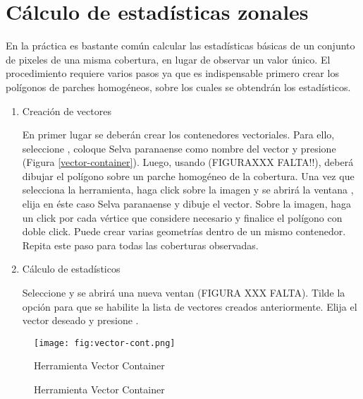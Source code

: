 \section{Cálculo de estadísticas zonales}

En la práctica es bastante común calcular las estadísticas básicas de un conjunto de pixeles de una misma cobertura, en lugar de observar un valor único. El procedimiento requiere varios pasos ya que es indispensable primero crear los polígonos de parches homogéneos, sobre los cuales se obtendrán los estadísticos.
\begin{enumerate}
	\item Creación de vectores
	
	En primer lugar se deberán crear los contenedores vectoriales. Para ello, seleccione , coloque Selva paranaense como nombre del vector y presione  (Figura \ref{vector-container}). Luego, usando   (FIGURAXXX FALTA!!), deberá dibujar el polígono sobre un parche homogéneo de la cobertura. Una vez que selecciona la herramienta, haga click sobre la imagen y se abrirá la ventana , elija en éste caso Selva paranaense y dibuje el vector. Sobre la imagen, haga un click por cada vértice que considere necesario y finalice el polígono con doble click. Puede crear varias geometrías dentro de un mismo contenedor. Repita este paso para todas las coberturas observadas.
	
	\item Cálculo de estadísticos
	
	Seleccione  y se abrirá una nueva ventan (FIGURA  XXX FALTA). Tilde la opción  para que se habilite la lista de vectores creados anteriormente. Elija el vector deseado y presione .
\end{enumerate}



\begin{figure}[h!]
    \centering
    \texttt{[image: fig:vector-cont.png]}
    \caption{Herramienta Vector Container}
    \label{fig:vector-container}
\end{figure}



\begin{figure}[h!]
    \centering
    \caption{Herramienta Vector Container}
    \label{fig:vector-container}
\end{figure}



